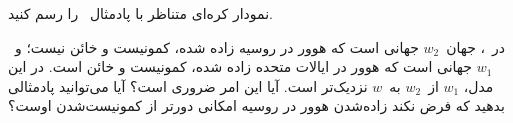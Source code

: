 \documentclass[../../../include/open-logic-section]{subfiles}
\begin{document}
\begin{prob}
نمودار کره‌ای متناظر با پادمثال~
را رسم کنید.
\end{prob}

\begin{prob}
  در~، جهان~$w_2$ جهانی است
  که هوور در روسیه زاده شده، کمونیست و خائن نیست؛ و~$w_1$ جهانی است که
  هوور در ایالات متحده زاده شده، کمونیست و خائن است. در این مدل، $w_1$
  از~$w_2$ به~$w$ نزدیک‌تر است. آیا این امر ضروری است؟ آیا می‌توانید
  پادمثالی بدهید که فرض نکند زاده‌شدن هوور در روسیه امکانی دورتر از
  کمونیست‌شدن اوست؟
\end{prob}
\end{document}

